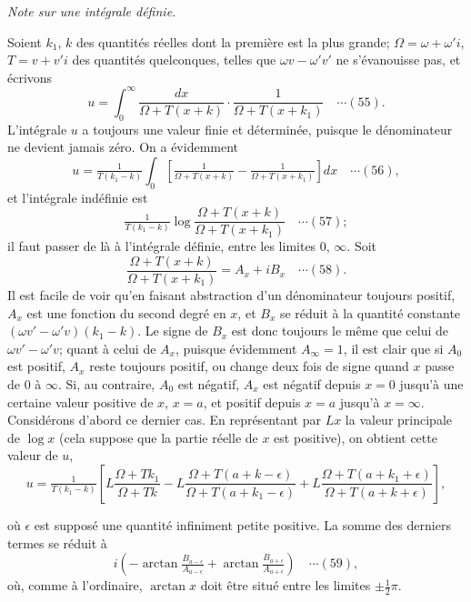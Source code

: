 \documentclass[12pt,a4paper]{article}
\begin{document}
\bigskip
\begin{center}
\textit{Note sur une int\'egrale d\'efinie.}
\end{center}

Soient $k_1$, $k$ des quantit\'es r\'eelles dont la premi\`ere est la plus grande; $\Omega = \omega + \omega' i$, $T = v + v' i$ des quantit\'es quelconques, telles que $\omega v - \omega' v'$ ne s'\'evanouisse pas, et \'ecrivons
\[
u = \int_0^{\infty}\frac{dx}{\Omega + T(x + k)} \cdot \frac{1}{\Omega + T(x + k_1)} \quad\cdots(55).
\]
L'int\'egrale $u$ a toujours une valeur finie et d\'etermin\'ee, puisque le d\'enominateur ne devient jamais z\'ero. On a \'evidemment
\[
u = \tfrac{1}{T(k_1 - k)}\int_0\left[\tfrac{1}{\Omega + T(x + k)} - \tfrac{1}{\Omega + T(x + k_1)}\right]dx \quad\cdots(56),
\]
et l'int\'egrale ind\'efinie est
\[
\tfrac{1}{T(k_1 - k)}\log\frac{\Omega + T(x + k)}{\Omega + T(x + k_1)} \quad\cdots(57);
\]
il faut passer de l\`a \`a l'int\'egrale d\'efinie, entre les limites $0$, $\infty$. Soit
\[
\frac{\Omega + T(x + k)}{\Omega + T(x + k_1)} = A_x + iB_x \quad\cdots(58).
\]
Il est facile de voir qu'en faisant abstraction d'un d\'enominateur toujours positif, $A_x$ est une fonction du second degr\'e en $x$, et $B_x$ se r\'eduit \`a la quantit\'e constante $(\omega v' - \omega' v)(k_1 - k)$. Le signe de $B_x$ est donc toujours le m\^eme que celui de $\omega v' - \omega' v$; quant \`a celui de $A_x$, puisque \'evidemment $A_{\infty} = 1$, il est clair que si $A_0$ est positif, $A_x$ reste toujours positif, ou change deux fois de signe quand $x$ passe de $0$ \`a $\infty$. Si, au contraire, $A_0$ est n\'egatif, $A_x$ est n\'egatif depuis $x = 0$ jusqu'\`a une certaine valeur positive de $x$, $x = a$, et positif depuis $x = a$ jusqu'\`a $x = \infty$. Consid\'erons d'abord ce dernier cas. En repr\'esentant par $Lx$ la valeur principale de $\log x$ (cela suppose que la partie r\'eelle de $x$ est positive), on obtient cette valeur de $u$,
\[
u = \tfrac{1}{T(k_1 - k)}\left[L\frac{\Omega + T k_1}{\Omega + Tk} - L\frac{\Omega + T(a + k - \epsilon)}{\Omega + T(a + k_1 - \epsilon)} + L\frac{\Omega + T(a + k_1 + \epsilon)}{\Omega + T(a + k + \epsilon)}\right],
\]

\newpage
\setcounter{page}{182}

o\`u $\epsilon$ est suppos\'e une quantit\'e infiniment petite positive. La somme des derniers termes se r\'eduit \`a
\[
i\left(-\arctan\tfrac{B_{a-\epsilon}}{A_{a-\epsilon}} + \arctan\tfrac{B_{a+\epsilon}}{A_{a+\epsilon}}\right) \quad\cdots(59),
\]
o\`u, comme \`a l'ordinaire, $\arctan x$ doit \^etre situ\'e entre les limites $\pm\tfrac12\pi$.
\end{document}
